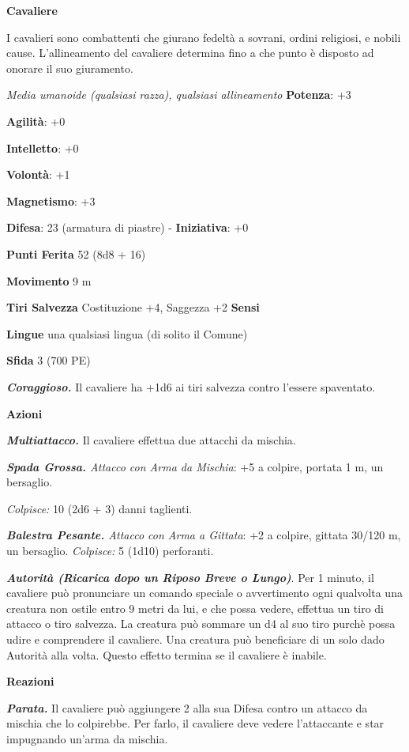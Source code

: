 \begin{multicols}{2}
\textbf{Cavaliere}

I cavalieri sono combattenti che giurano fedeltà a sovrani, ordini
religiosi, e nobili cause. L'allineamento del cavaliere determina fino a
che punto è disposto ad onorare il suo giuramento.

\emph{Media umanoide (qualsiasi razza), qualsiasi allineamento}
\textbf{Potenza}: +3

\textbf{Agilità}: +0

\textbf{Intelletto}: +0

\textbf{Volontà}: +1

\textbf{Magnetismo}: +3

\textbf{Difesa}: 23 (armatura di piastre) - \textbf{Iniziativa}: +0

\textbf{Punti Ferita} 52 (8d8 + 16)

\textbf{Movimento} 9 m

\textbf{Tiri Salvezza} Costituzione +4, Saggezza +2 \textbf{Sensi}


\textbf{Lingue} una qualsiasi lingua (di solito il Comune)

\textbf{Sfida} 3 (700 PE)\smallskip

\emph{\textbf{Coraggioso.}} Il cavaliere ha +1d6 ai tiri salvezza
contro l'essere spaventato.

\smallskip\textbf{Azioni}

\emph{\textbf{Multiattacco.}} Il cavaliere effettua due attacchi da
mischia.

\emph{\textbf{Spada Grossa.} Attacco con Arma da Mischia}: +5 a colpire,
portata 1 m, un bersaglio.

\emph{Colpisce:} 10 (2d6 + 3) danni taglienti.

\emph{\textbf{Balestra Pesante.} Attacco con Arma a Gittata}: +2 a
colpire, gittata 30/120 m, un bersaglio. \emph{Colpisce:} 5 (1d10)
perforanti.

\emph{\textbf{Autorità (Ricarica dopo un Riposo Breve o Lungo)}}. Per 1
minuto, il cavaliere può pronunciare un comando speciale o avvertimento
ogni qualvolta una creatura non ostile entro 9 metri da lui, e che possa
vedere, effettua un tiro di attacco o tiro salvezza. La creatura può
sommare un d4 al suo tiro purchè possa udire e comprendere il cavaliere.
Una creatura può beneficiare di un solo dado Autorità alla volta. Questo
effetto termina se il cavaliere è inabile.

\textbf{Reazioni}

\emph{\textbf{Parata.}} Il cavaliere può aggiungere 2 alla sua Difesa contro
un attacco da mischia che lo colpirebbe. Per farlo, il cavaliere deve
vedere l'attaccante e star impugnando un'arma da mischia.




\end{multicols}
